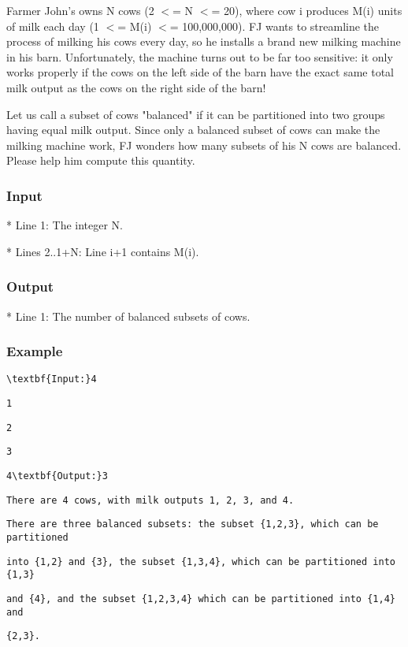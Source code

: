 

Farmer John's owns N cows (2 $<$= N $<$= 20), where cow i produces M(i) units of milk each day (1 $<$= M(i) $<$= 100,000,000).  FJ wants to streamline the process of milking his cows every day, so he installs a brand new milking machine in his barn.  Unfortunately, the machine turns out to be far too sensitive: it only works properly if the cows on the left side of the barn have the exact same total milk output as the cows on the right side of the barn! 

Let us call a subset of cows "balanced" if it can be partitioned into two groups having equal milk output.  Since only a balanced subset of cows can make the milking machine work, FJ wonders how many subsets of his N cows are balanced.  Please help him compute this quantity.

\subsubsection{Input}

* Line 1: The integer N.

* Lines 2..1+N: Line i+1 contains M(i).

\subsubsection{Output}

* Line 1: The number of balanced subsets of cows.

\subsubsection{Example}
\begin{verbatim}
\textbf{Input:}4 \end{verbatim}
\begin{verbatim}
1 \end{verbatim}
\begin{verbatim}
2 \end{verbatim}
\begin{verbatim}
3 \end{verbatim}
\begin{verbatim}
4\textbf{Output:}3\end{verbatim}
\begin{verbatim}
There are 4 cows, with milk outputs 1, 2, 3, and 4.\end{verbatim}
\begin{verbatim}
There are three balanced subsets: the subset {1,2,3}, which can be partitioned \end{verbatim}
\begin{verbatim}
into {1,2} and {3}, the subset {1,3,4}, which can be partitioned into {1,3} \end{verbatim}
\begin{verbatim}
and {4}, and the subset {1,2,3,4} which can be partitioned into {1,4} and \end{verbatim}
\begin{verbatim}
{2,3}.\end{verbatim}